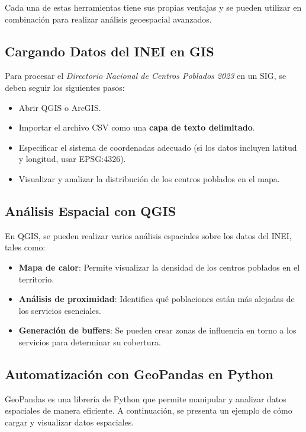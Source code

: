 \documentclass{article}
\begin{document}
{Cada una de estas herramientas tiene sus propias ventajas y se pueden utilizar en combinación para realizar análisis geoespacial avanzados.

\subsection*{Cargando Datos del INEI en GIS}
Para procesar el \textit{Directorio Nacional de Centros Poblados 2023} en un SIG, se deben seguir los siguientes pasos:

\begin{itemize}
	\item Abrir QGIS o ArcGIS.
	\item Importar el archivo CSV como una \textbf{capa de texto delimitado}.
	\item Especificar el sistema de coordenadas adecuado (si los datos incluyen latitud y longitud, usar EPSG:4326).
	\item Visualizar y analizar la distribución de los centros poblados en el mapa.
\end{itemize}

\subsection*{Análisis Espacial con QGIS}
En QGIS, se pueden realizar varios análisis espaciales sobre los datos del INEI, tales como:

\begin{itemize}
	\item \textbf{Mapa de calor}: Permite visualizar la densidad de los centros poblados en el territorio.
	\item \textbf{Análisis de proximidad}: Identifica qué poblaciones están más alejadas de los servicios esenciales.
	\item \textbf{Generación de buffers}: Se pueden crear zonas de influencia en torno a los servicios para determinar su cobertura.
\end{itemize}

\subsection*{Automatización con GeoPandas en Python}
GeoPandas es una librería de Python que permite manipular y analizar datos espaciales de manera eficiente. A continuación, se presenta un ejemplo de cómo cargar y visualizar datos espaciales.

}
\end{document}
